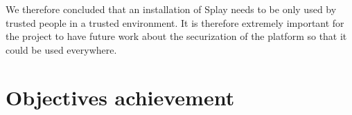 \documentclass{eplmastersthesis}
\begin{document}
        We therefore concluded that an installation of Splay needs to be only
        used by trusted people in a trusted environment. It is therefore
        extremely important for the project to have future work about the
        securization of the platform so that it could be used everywhere.

    \section{Objectives achievement} %

  \nocite{*}
  
  

  \backcoverpage
\end{document}
